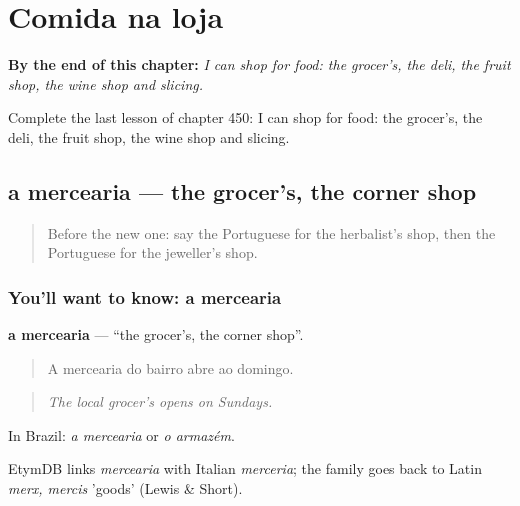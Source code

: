 
\chapter{Comida na loja}
\label{ch:pt-comida-na-loja}

\begin{chapteropening}
\textbf{By the end of this chapter:} \emph{I can shop for food: the grocer's, the deli, the fruit shop, the wine shop and slicing.}

Complete the last lesson of chapter 450: I can shop for food: the grocer's, the deli, the fruit shop, the wine shop and slicing.
\end{chapteropening}

\section[a mercearia]{a mercearia — the grocer's, the corner shop}

\label{lesson:PT-C450-mercearia}



\begin{quote}
Before the new one: say the Portuguese for the herbalist's shop, then the Portuguese for the jeweller's shop.
\end{quote}

\subsection*{You'll want to know: a mercearia}
\textbf{a mercearia} — \textquotedblleft{}the grocer's, the corner shop\textquotedblright{}.

\begin{quote}
A mercearia do bairro abre ao domingo.
\end{quote}

\begin{quote}
\emph{The local grocer's opens on Sundays.}
\end{quote}

In Brazil: \emph{a mercearia} or \emph{o armazém}.

\begin{cousinweb}
EtymDB links \emph{mercearia} with Italian \emph{merceria}; the family goes back to Latin \emph{merx, mercis} 'goods' (Lewis \& Short).
\end{cousinweb}

